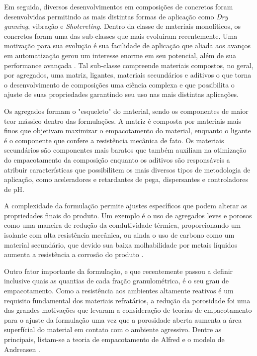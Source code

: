     Em seguida, diversos desenvolvimentos em composições de concretos foram
    desenvolvidas permitindo as mais distintas formas de aplicação como
    \textit{Dry gunning}, vibração e \textit{Shotcreting}.    Dentro da classe
    de materiais monolíticos, os concretos foram uma das sub-classes que mais
    evoluíram recentemente. Uma motivação para sua evolução é sua facilidade de
    aplicação que aliada aos avanços em automatização gerou um interesse enorme
    em seu potencial, além de sua performance avançada \cite{Schacht2004}. Tal
    sub-classe compreende materiais compostos, no geral, por agregados, uma
    matriz, ligantes, materiais secundários e aditivos o que torna o
    desenvolvimento de composições uma ciência complexa e que possibilita o ajuste de suas propriedades garantindo seu uso nas mais distintas aplicações.
    
    Os agregados formam o "esqueleto" do material, sendo os componentes de maior teor mássico dentro das formulações. A matriz é composta por materiais mais finos que objetivam maximizar o empacotamento do material, enquanto o ligante é o componente que confere a resistência mecânica de fato. Os materiais secundários são componentes mais baratos que também auxiliam na otimização do empacotamento da composição enquanto os aditivos são responsáveis a atribuir características que possibilitem os mais diversos tipos de metodologia de aplicação, como aceleradores e retardantes de pega, dispersantes e controladores de pH.
    
    A complexidade da formulação permite ajustes específicos que podem alterar as propriedades finais do produto. Um exemplo é o uso de agregados leves e porosos como uma maneira de redução da condutividade térmica, proporcionando um isolante com alta resistência mecânica, ou ainda o uso de carbono como um material secundário, que devido sua baixa molhabilidade por metais líquidos aumenta a resistência a corrosão do produto \cite{Schacht2004}.
    
    Outro fator importante da formulação, e que recentemente passou a definir
    inclusive quais as quantias de cada fração granulométrica, é o seu grau de
    empacotamento. Como a resistência aos ambientes altamente reativos é um
    requisito fundamental dos materiais refratários, a redução da porosidade foi
    uma das grandes motivações que levaram a consideração de teorias de
    empacotamento para o ajuste da formulação uma vez que a porosidade aberta aumenta a área superfícial do material em contato com o ambiente agressivo. Dentre as principais, listam-se a teoria de empacotamento de Alfred e o modelo de Andreasen \cite{Ortega1997}. 
    
